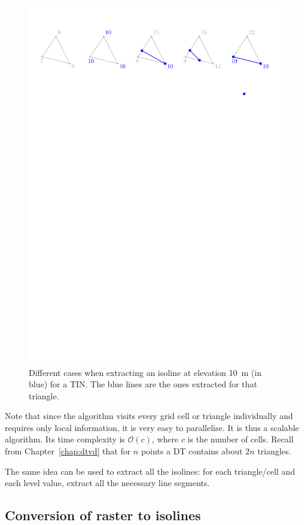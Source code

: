 \begin{figure}
  \centering
  \includegraphics[width=0.95\linewidth]{figs/isoline-tr}
\caption{Different cases when extracting an isoline at elevation \qty{10}{\m} (in blue) for a TIN\@. The blue lines are the ones extracted for that triangle.}%
\label{fig:isoline-tr}
\end{figure}
Note that since the algorithm visits every grid cell or triangle individually and requires only local information, it is very easy to parallelise. 
It is thus a scalable algorithm.
Its time complexity is $\mathcal{O}(c)$, where $c$ is the number of cells.
Recall from Chapter~\ref{chap:dtvd} that for $n$ points a DT contains about $2n$ triangles.

The same idea can be used to extract all the isolines: for each triangle/cell and each level value, extract all the necessary line segments.


\subsection{Conversion of raster to isolines}%
\label{sec:r-iso}


